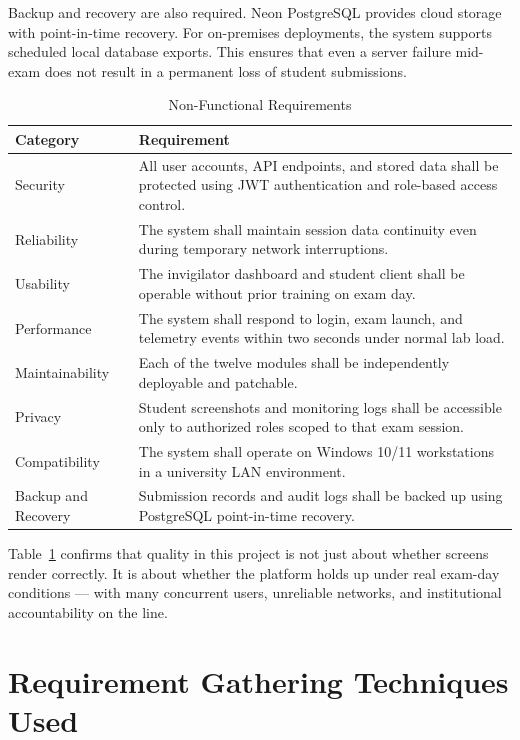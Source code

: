 Backup and recovery are also required. Neon PostgreSQL provides cloud storage with point-in-time recovery. For on-premises deployments, the system supports scheduled local database exports. This ensures that even a server failure mid-exam does not result in a permanent loss of student submissions.

\begin{table}[H]
\centering
\caption{Non-Functional Requirements}
\label{tab:nonfunctionalrequirements}
\begin{tabular}{lp{10cm}}
\hline\hline
\textbf{Category} & \textbf{Requirement} \\
\hline\hline
Security & All user accounts, API endpoints, and stored data shall be protected using JWT authentication and role-based access control. \\
Reliability & The system shall maintain session data continuity even during temporary network interruptions. \\
Usability & The invigilator dashboard and student client shall be operable without prior training on exam day. \\
Performance & The system shall respond to login, exam launch, and telemetry events within two seconds under normal lab load. \\
Maintainability & Each of the twelve modules shall be independently deployable and patchable. \\
Privacy & Student screenshots and monitoring logs shall be accessible only to authorized roles scoped to that exam session. \\
Compatibility & The system shall operate on Windows 10/11 workstations in a university LAN environment. \\
Backup and Recovery & Submission records and audit logs shall be backed up using PostgreSQL point-in-time recovery. \\
\hline\hline
\end{tabular}
\end{table}

Table~\ref{tab:nonfunctionalrequirements} confirms that quality in this project is not just about whether screens render correctly. It is about whether the platform holds up under real exam-day conditions — with many concurrent users, unreliable networks, and institutional accountability on the line.

\section{Requirement Gathering Techniques Used}

